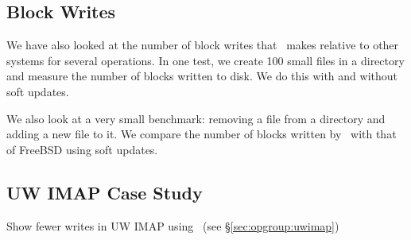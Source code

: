 \subsection {Block Writes}
We have also looked at the number of block writes that \Kudos\ makes
relative to other systems for several operations. In one test, we create
100 small files in a directory and measure the number of blocks written to
disk. We do this with and without soft updates.

We also look at a very small benchmark: removing a file from a directory
and adding a new file to it. We compare the number of blocks written by
\Kudos\ with that of FreeBSD using soft updates.

\subsection {UW IMAP Case Study}
\label{sec:evaluation:uwimap}

Show fewer writes in UW IMAP using \opgroups\ (see \S\ref{sec:opgroup:uwimap})
